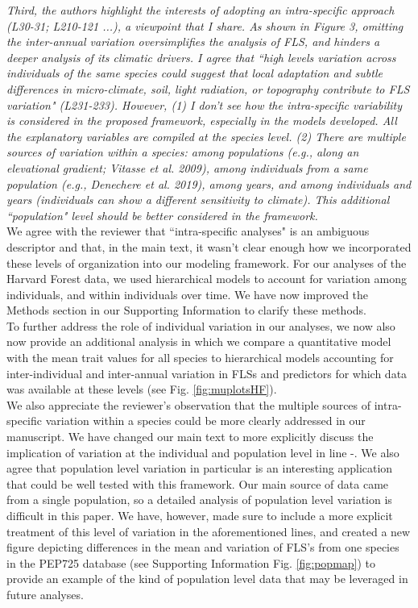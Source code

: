 \documentclass{article}[11pt]
\begin{document}
\emph{Third, the authors highlight the interests of adopting an intra-specific approach (L30-31; L210-121 ...), a viewpoint that I share. As shown in Figure 3, omitting the inter-annual variation oversimplifies the analysis of FLS, and hinders a deeper analysis of its climatic drivers. I agree that ``high levels variation across individuals of the same species could suggest that local adaptation and subtle differences in micro-climate, soil, light radiation, or topography contribute to FLS variation" (L231-233). However, (1) I don't see how the intra-specific variability is considered in the proposed framework, especially in the models developed. All the explanatory variables are compiled at the species level. (2) There are multiple sources of variation within a species: among populations (e.g., along an elevational gradient; Vitasse et al. 2009), among individuals from a same population (e.g., Denechere et al. 2019), among years, and among individuals and years (individuals can show a different sensitivity to climate). This additional ``population" level should be better considered in the framework.}\\

\noindent We agree with the reviewer that ``intra-specific analyses" is an ambiguous descriptor and that, in the main text, it wasn't clear enough how we incorporated these levels of organization into our modeling framework. For our analyses of the Harvard Forest data, we used hierarchical models to account for variation among individuals, and within individuals over time. We have now improved the Methods section in our Supporting Information to clarify these methods.\\ 

\noindent To further address the role of individual variation in our analyses, we now also now provide an additional analysis in which we compare a quantitative model with the mean trait values for all species to hierarchical models accounting for inter-individual and inter-annual variation in FLSs and predictors for which data was available at these levels (see Fig.  \ref{fig:muplotsHF}).\\

\indent We also appreciate the reviewer's observation that the multiple sources of intra-specific variation within a species could be more clearly addressed in our manuscript. We have changed our main text to more explicitly discuss the implication of variation at the individual and population level in line -.  We also agree that population level variation in particular is an interesting application that could be well tested with this framework. Our main source of data came from a single population, so a detailed analysis of population level variation is difficult in this paper. We have, however, made sure to include a more explicit treatment of this level of variation in the aforementioned lines, and created a new figure depicting differences in the mean and variation of FLS's from one species in the PEP725 database (see Supporting Information Fig. \ref{fig:popmap}) to provide an example of the kind of population level data that may be leveraged in future analyses.\\
\end{document}
